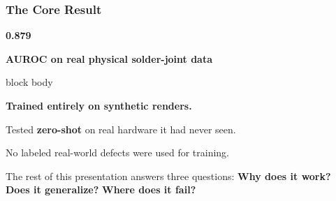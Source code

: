 \documentclass[aspectratio=169,11pt]{beamer}
\newcommand{\emphred}[1]{\textcolor{secondary}{#1}}
\newcommand{\emphhighlight}[1]{\textcolor{primary}{\textbf{#1}}}
\begin{document}
\begin{frame}\frametitle{\emphred{The Core Result}}

\begin{center}

{\fontsize{44}{48}\selectfont
\bfseries
\color{accent}
0.879}

\vspace{0.05cm}

{\normalsize
\bfseries
AUROC on real physical solder-joint data}

\vspace{0.3cm}

\begin{beamercolorbox}[
    wd=0.86\paperwidth,
    rounded=true,
    shadow=true,
    sep=0.5em
  ]{block body}

\begin{center}
\normalsize
\textbf{Trained entirely on synthetic renders.}

\vspace{0.08cm}

Tested \emphhighlight{zero-shot}
on real hardware it had never seen.

\vspace{0.08cm}

No labeled real-world defects were used for training.
\end{center}

\end{beamercolorbox}

\vspace{0.3cm}

{\footnotesize
The rest of this presentation answers three questions:
\textbf{Why does it work?}
\quad
\textbf{Does it generalize?}
\quad
\textbf{Where does it fail?}
}

\end{center}

\end{frame}
\end{document}
